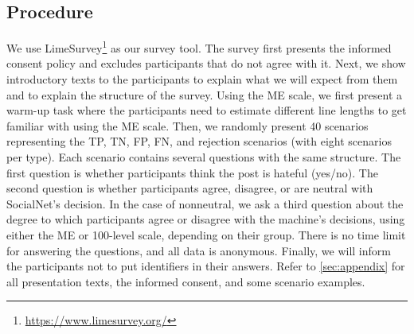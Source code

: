\subsection{Procedure}
We use LimeSurvey\footnote{\url{https://www.limesurvey.org/}} as our survey tool.
%
The survey first presents the informed consent policy and excludes participants that do not agree with it.
%
Next, we show introductory texts to the participants to explain what we will expect from them and to explain the structure of the survey.
%
Using the ME scale, we first present a warm-up task where the participants need to estimate different line lengths to get familiar with using the ME scale.
%
Then, we randomly present 40 scenarios representing the TP, TN, FP, FN, and rejection scenarios (with eight scenarios per type).
%
Each scenario contains several questions with the same structure.
%
The first question is whether participants think the post is hateful (yes/no).
%
The second question is whether participants agree, disagree, or are neutral with SocialNet's decision.
%
In the case of nonneutral, we ask a third question about the degree to which participants agree or disagree with the machine's decisions, using either the ME or 100-level scale, depending on their group.
%
There is no time limit for answering the questions, and all data is anonymous.
%
Finally, we will inform the participants not to put identifiers in their answers.
%
Refer to \autoref{sec:appendix} for all presentation texts, the informed consent, and some scenario examples.

